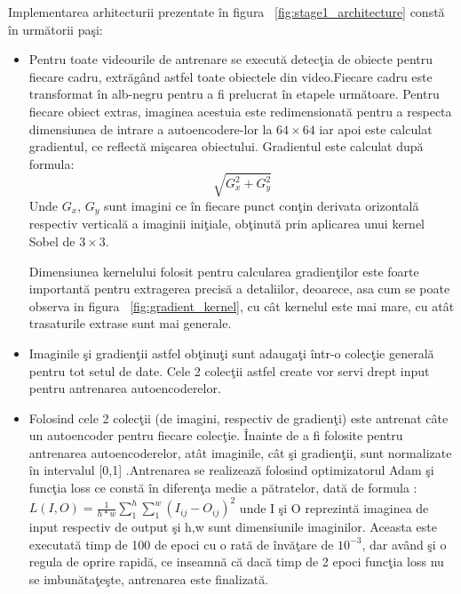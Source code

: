 \documentclass[a4paper,12pt]{report}
\begin{document}
\par
Implementarea arhitecturii prezentate în figura ~\ref{fig:stage1_architecture} constă în următorii paşi:
\begin {itemize}
\item Pentru toate videourile de antrenare se execută detecţia de obiecte pentru fiecare cadru, extrăgând astfel toate obiectele din video.Fiecare cadru este transformat în alb-negru pentru a fi prelucrat în etapele următoare. Pentru fiecare obiect extras, imaginea acestuia este redimensionată pentru a respecta dimensiunea de intrare a autoencodere-lor la \( 64 \times 64 \) iar apoi este calculat gradientul, ce reflectă mişcarea obiectului. Gradientul este calculat după formula: \[\sqrt{G_{x}^2 + G_{y}^2}\] Unde \(G_{x}\), \(G_{y}\) sunt imagini ce în fiecare punct conţin derivata orizontală respectiv verticală a imaginii iniţiale, obţinută prin aplicarea unui kernel Sobel de \(3 \times 3 \).
\par Dimensiunea kernelului folosit pentru calcularea gradienţilor este foarte importantă pentru extragerea precisă a detaliilor, deoarece, asa cum se poate observa in figura ~\ref{fig:gradient_kernel}, cu cât kernelul este mai mare, cu atât trasaturile extrase sunt mai generale.
\item Imaginile şi gradienţii astfel obţinuţi sunt adaugaţi într-o colecţie generală pentru tot setul de date. Cele 2 colecţii astfel create vor servi drept input pentru antrenarea autoencoderelor.
\item Folosind cele 2 colecţii (de imagini, respectiv de gradienţi) este antrenat câte un autoencoder pentru fiecare colecţie. Înainte de a fi folosite pentru antrenarea autoencoderelor, atât imaginile, cât şi gradienţii, sunt normalizate în intervalul [0,1] .Antrenarea se realizează folosind optimizatorul Adam \cite{adam2017} şi funcţia loss ce constă în diferenţa medie a pătratelor, dată de formula : 
\(L(I,O) = \frac{1} {h*w} \sum_{1}^{h} \sum_{1}^{w} (I_{ij} - O_{ij})^2 \)   \cite{ionescu2019object} unde I şi O reprezintă imaginea de input respectiv de output şi h,w sunt dimensiunile imaginilor. Aceasta este executată timp de 100 de epoci cu o rată de învăţare de \(10^{-3}\), dar având şi o regula de oprire rapidă, ce inseamnă că dacă timp de 2 epoci funcţia loss nu se imbunătaţeşte, antrenarea este finalizată.
\end{itemize}
\end{document}
